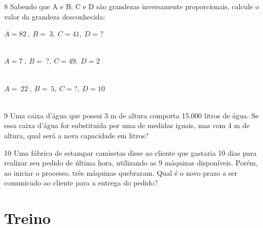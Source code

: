 \num{8} Sabendo que A e B; C e D são grandezas inversamente proporcionais,
calcule o valor da grandeza desconhecida:

\begin{escolha}[itemsep=0pt]
\item $A = 82\ ,\ B = \ 3,\ C = 41,\ D = ?$ \\ 
 \\
\item $A = 7\ ,\ B = \ ?,\ C = 49,\ D = 2$ \\
 \\
\item $A = \ 22\ ,\ B = \ 5,\ C = ?,\ D = 10$ \\
  \\
\end{escolha}

\num{9} Uma caixa d'água que possui 3 m de altura comporta 15.000 litros de
água. Se essa caixa d'água for substituída por uma de medidas iguais,
mas com 4 m de altura, qual será a nova capacidade em litros?


\num{10} Uma fábrica de estampar camisetas disse ao cliente que gastaria 10
dias para realizar seu pedido de última hora, utilizando as 9 máquinas
disponíveis. Porém, ao iniciar o processo, três máquinas quebraram. Qual
é o novo prazo a ser comunicado ao cliente para a entrega do pedido?


\section*{Treino}

